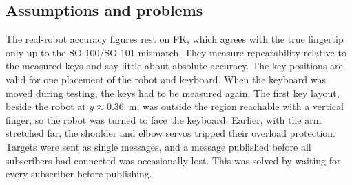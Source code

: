 \documentclass[conference]{IEEEtran}
\begin{document}
\begin{table}[t]
\centering
\caption{Real robot: where the fingertip settled (FK) after each command}
\label{tab:real}
\end{table}

\subsection{Assumptions and problems}
The real-robot accuracy figures rest on FK, which agrees with the true fingertip only up to the SO-100/SO-101 mismatch. They measure repeatability relative to the measured keys and say little about absolute accuracy. The key positions are valid for one placement of the robot and keyboard. When the keyboard was moved during testing, the keys had to be measured again. The first key layout, beside the robot at $y\approx0.36$~m, was outside the region reachable with a vertical finger, so the robot was turned to face the keyboard. Earlier, with the arm stretched far, the shoulder and elbow servos tripped their overload protection. Targets were sent as single messages, and a message published before all subscribers had connected was occasionally lost. This was solved by waiting for every subscriber before publishing.

\end{document}
